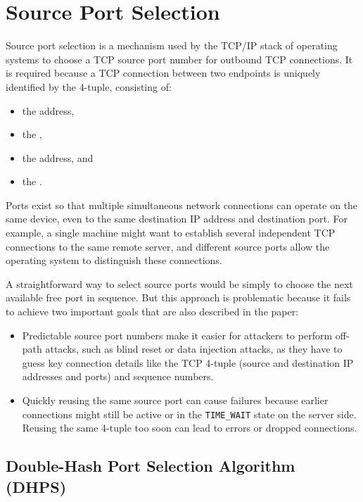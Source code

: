 \documentclass{report}
\begin{document}
\section{Source Port Selection}
\label{sec:source port selection}

Source port selection is a mechanism used by the TCP/IP stack of operating systems to choose a TCP source port number for outbound TCP connections. It is required because a TCP connection between two endpoints is uniquely identified by the \alert{4-tuple}, consisting of:
\begin{itemize}
	\item the  address,
	\item the ,
	\item the  address, and
	\item the .
\end{itemize}

\alert{Ports} exist so that multiple simultaneous network connections can operate on the same device, even to the same destination IP address and destination port. For example, a single machine might want to establish several independent TCP connections to the same remote server, and different source ports allow the operating system to distinguish these connections.

A straightforward way to select source ports would be simply to choose the next available free port in sequence. But this approach is problematic because it fails to achieve two important goals that are also described in the paper:

\begin{itemize}
	\item {} Predictable source port numbers make it easier for attackers to perform off-path attacks, such as blind reset or data injection attacks, as they have to guess key connection details like the TCP 4-tuple (source and destination IP addresses and ports) and sequence numbers.
	\item {} Quickly reusing the same source port can cause failures because earlier connections might still be active or in the \texttt{TIME\_WAIT} state on the server side. Reusing the same 4-tuple too soon can lead to errors or dropped connections.
\end{itemize}

\subsection{Double-Hash Port Selection Algorithm (DHPS)}
\label{sec:double-hash port selection algorithm}
\end{document}
